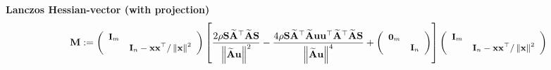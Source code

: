 \documentclass{article}
\newcommand{\assign}{:=}
\newcommand{\tmstrong}[1]{\textbf{#1}}
\newcommand{\x}{\mathbf{x}}
\newcommand{\A}{\mathbf{A}}
\newcommand{\0}{\textbf{0}}
\newcommand{\I}{\mathbf{I}}
\newcommand{\M}{\mathbf{M}}
\newcommand{\tmu}{\mathbf{u}}
\newcommand{\bs}{\mathbf{S}}
\begin{document}
{\tmstrong{Lanczos Hessian-vector (with projection)}}
\[ \M \assign \small{\left(\begin{array}{cc}
     \I_m & \\
     & \I_n - \x \x^{\top} / \left\| \x \right\|^2
   \end{array}\right)} \left[ \frac{2 \rho \bs \widetilde{\A}^{\top}
   \widetilde{\A} \bs}{\left\| \widetilde{\A} \tmu \right\|^2} - \frac{4 \rho
   \bs \widetilde{\A}^{\top} \widetilde{\A} \tmu \tmu^{\top}
   \widetilde{\A}^{\top} \widetilde{\A} \bs}{\left\| \widetilde{\A} \tmu
   \right\|^4} + \small{\left(\begin{array}{cc}
     \0_m & \\
     & \I_n
   \end{array}\right)} \right] \small{\left(\begin{array}{cc}
     \I_m & \\
     & \I_n - \x \x^{\top} / \left\| \x \right\|^2
   \end{array}\right)} \]
\end{document}
